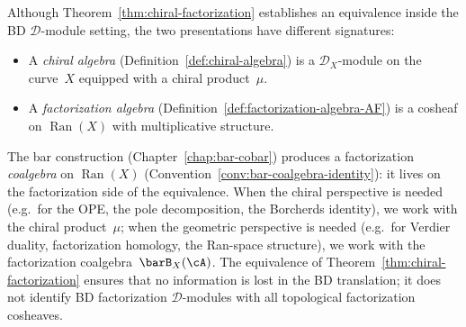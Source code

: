 \begin{remark}
\label{rem:chiral-vs-factorization}
Although Theorem~\ref{thm:chiral-factorization} establishes an
equivalence inside the BD $\mathcal D$-module setting, the two
presentations have different signatures:
\begin{itemize}
\item A \emph{chiral algebra}
 (Definition~\ref{def:chiral-algebra}) is a
 $\mathcal{D}_X$-module on the curve~$X$ equipped with a
 chiral product~$\mu$.
\item A \emph{factorization algebra}
 (Definition~\ref{def:factorization-algebra-AF}) is a
 cosheaf on $\operatorname{Ran}(X)$ with multiplicative
 structure.
\end{itemize}
The bar construction
(Chapter~\ref{chap:bar-cobar}) produces a factorization
\emph{coalgebra} on $\operatorname{Ran}(X)$
(Convention~\ref{conv:bar-coalgebra-identity}): it lives on
the factorization side of the equivalence. When the chiral
perspective is needed (e.g.\ for the OPE, the pole
decomposition, the Borcherds identity), we work with the
chiral product~$\mu$; when the geometric perspective is needed
(e.g.\ for Verdier duality, factorization homology, the
Ran-space structure), we work with the factorization
coalgebra~$\barB_X(\cA)$. The equivalence of
Theorem~\ref{thm:chiral-factorization} ensures that no
information is lost in the BD translation; it does not identify
BD factorization $\mathcal D$-modules with all topological
factorization cosheaves.
\end{remark}

